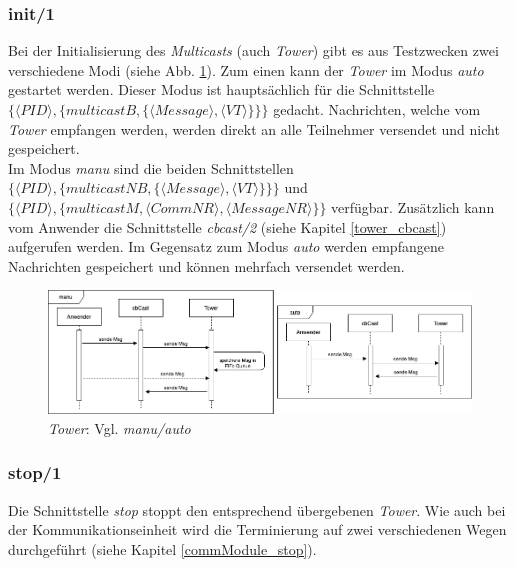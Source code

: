 \subsubsection{init/1} \label{towercbc_init_entwurf}

Bei der Initialisierung des \textit{Multicasts} (auch \textit{Tower}) gibt es aus Testzwecken zwei verschiedene Modi (siehe Abb. \ref{fig:sequence_tower_init}). Zum einen kann der \textit{Tower} im Modus \textit{auto} gestartet werden. Dieser Modus ist hauptsächlich für die  Schnittstelle $\{\langle PID\rangle,\{multicastB,\{\langle Message\rangle,\langle VT\rangle\}\}\}$ gedacht. Nachrichten, welche vom \textit{Tower} empfangen werden, werden direkt an alle Teilnehmer versendet und nicht gespeichert.\\
Im Modus \textit{manu} sind die beiden Schnittstellen $\{\langle PID\rangle,\{multicastNB,\{\langle Message\rangle,\langle VT\rangle\}\}\}$ und $\{\langle PID\rangle,\{multicastM,\langle CommNR\rangle,\langle MessageNR\rangle\}\}$ verfügbar. Zusätzlich kann vom Anwender die Schnittstelle \textit{cbcast/2} (siehe Kapitel \ref{tower_cbcast}) aufgerufen werden. Im Gegensatz zum Modus \textit{auto} werden empfangene Nachrichten gespeichert und können mehrfach versendet werden.

\begin{figure}[htbp]
\begin{center}
\includegraphics[scale=0.43]{Latex/Bilder/towerCBC_init.png}
\caption{\label{fig:sequence_tower_init} \textit{Tower}: Vgl. \textit{manu/auto}}
\end{center}
\end{figure}


\subsubsection{stop/1}

Die Schnittstelle \textit{stop} stoppt den entsprechend übergebenen \textit{Tower}. Wie auch bei der Kommunikationseinheit wird die Terminierung auf zwei verschiedenen Wegen durchgeführt (siehe Kapitel \ref{commModule_stop}).

